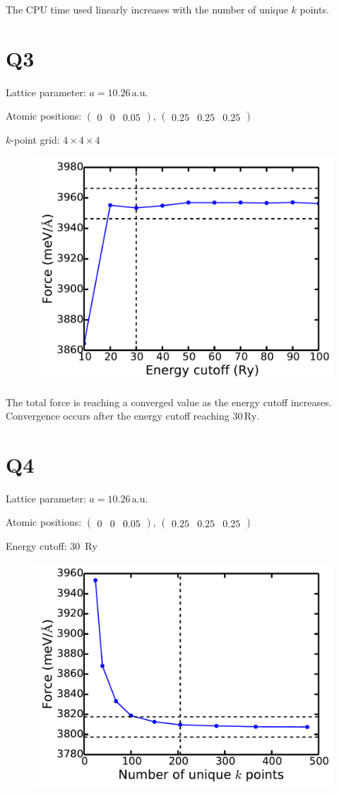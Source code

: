 \documentclass[12pt]{article}
\newcommand{\unit}[1]{\ensuremath{\, \mathrm{#1}}}
\begin{document}
The CPU time used linearly increases with the number of unique $k$ points. 

\section*{Q3}

Lattice parameter: $a = 10.26\unit{a.u.}$

\noindent Atomic positions: $\begin{pmatrix}0 & 0 & 0.05\end{pmatrix}$, $\begin{pmatrix}0.25 & 0.25 & 0.25\end{pmatrix}$

\noindent $k$-point grid: $4\times4\times4$

\begin{figure}[h]
\begin{center}
\includegraphics[width=.5\textwidth]{Q3}
\end{center}
\end{figure}

The total force is reaching a converged value as the energy cutoff increases. Convergence occurs after the energy cutoff reaching 30\unit{Ry}. 

\section*{Q4}

Lattice parameter: $a = 10.26\unit{a.u.}$

\noindent Atomic positions: $\begin{pmatrix}0 & 0 & 0.05\end{pmatrix}$, $\begin{pmatrix}0.25 & 0.25 & 0.25\end{pmatrix}$

\noindent Energy cutoff: 30 \unit{Ry}

\begin{figure}[h]
\begin{center}
\includegraphics[width=.5\textwidth]{Q4}
\end{center}
\end{figure}
\end{document}
